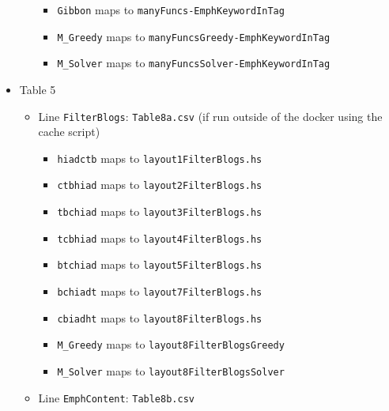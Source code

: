 \begin{itemize}
\begin{itemize}
    \begin{itemize}
    \tightlist
    \item
      \texttt{Gibbon} maps to \texttt{manyFuncs-EmphKeywordInTag}
    \item
      \texttt{M\_Greedy} maps to
      \texttt{manyFuncsGreedy-EmphKeywordInTag}
    \item
      \texttt{M\_Solver} maps to
      \texttt{manyFuncsSolver-EmphKeywordInTag}
    \end{itemize}
  \end{itemize}
\item
  Table 5

  \begin{itemize}
  \tightlist
  \item
    Line \texttt{FilterBlogs}: \texttt{Table8a.csv} (if run outside of
    the docker using the cache script)

    \begin{itemize}
    \tightlist
    \item
      \texttt{hiadctb} maps to \texttt{layout1FilterBlogs.hs}
    \item
      \texttt{ctbhiad} maps to \texttt{layout2FilterBlogs.hs}
    \item
      \texttt{tbchiad} maps to \texttt{layout3FilterBlogs.hs}
    \item
      \texttt{tcbhiad} maps to \texttt{layout4FilterBlogs.hs}
    \item
      \texttt{btchiad} maps to \texttt{layout5FilterBlogs.hs}
    \item
      \texttt{bchiadt} maps to \texttt{layout7FilterBlogs.hs}
    \item
      \texttt{cbiadht} maps to \texttt{layout8FilterBlogs.hs}
    \item
      \texttt{M\_Greedy} maps to \texttt{layout8FilterBlogsGreedy}
    \item
      \texttt{M\_Solver} maps to \texttt{layout8FilterBlogsSolver}
    \end{itemize}
  \item
    Line \texttt{EmphContent}: \texttt{Table8b.csv}


\end{itemize}
\end{itemize}
